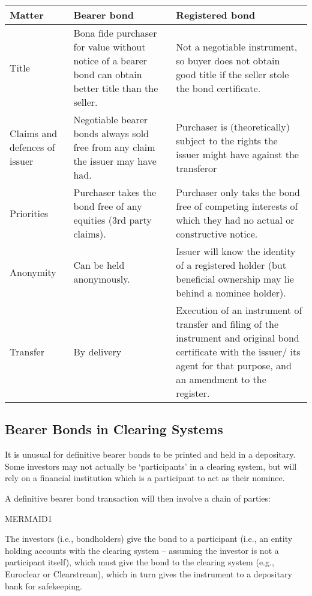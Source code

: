 \documentclass[
]{article}
\begin{document}
\begin{longtable}[]{@{}lll@{}}
\toprule()
Matter & Bearer bond & Registered bond \\
\midrule()
\endhead
Title & Bona fide purchaser for value without notice of a bearer bond
can obtain better title than the seller. & Not a negotiable instrument,
so buyer does not obtain good title if the seller stole the bond
certificate. \\
Claims and defences of issuer & Negotiable bearer bonds always sold free
from any claim the issuer may have had. & Purchaser is (theoretically)
subject to the rights the issuer might have against the transferor \\
Priorities & Purchaser takes the bond free of any equities (3rd party
claims). & Purchaser only taks the bond free of competing interests of
which they had no actual or constructive notice. \\
Anonymity & Can be held anonymously. & Issuer will know the identity of
a registered holder (but beneficial ownership may lie behind a nominee
holder). \\
Transfer & By delivery & Execution of an instrument of transfer and
filing of the instrument and original bond certificate with the issuer/
its agent for that purpose, and an amendment to the register. \\
\bottomrule()
\end{longtable}

\hypertarget{bearer-bonds-in-clearing-systems}{%
\subsection{Bearer Bonds in Clearing
Systems}\label{bearer-bonds-in-clearing-systems}}

It is unusual for definitive bearer bonds to be printed and held in a
depositary. Some investors may not actually be `participants' in a
clearing system, but will rely on a financial institution which is a
participant to act as their nominee.

A definitive bearer bond transaction will then involve a chain of
parties:

MERMAID1

The investors (i.e., bondholders) give the bond to a participant (i.e.,
an entity holding accounts with the clearing system -- assuming the
investor is not a participant itself), which must give the bond to the
clearing system (e.g., Euroclear or Clearstream), which in turn gives
the instrument to a depositary bank for safekeeping.
\end{document}
